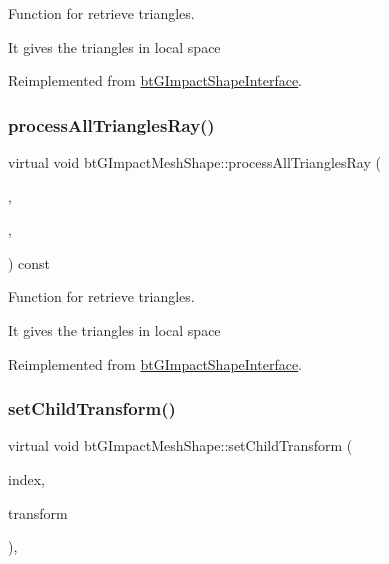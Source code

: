 Function for retrieve triangles. 

It gives the triangles in local space 

Reimplemented from \hyperlink{classbtGImpactShapeInterface_af67273183582c6696169ee4ae5d6cf37}{bt\+G\+Impact\+Shape\+Interface}.

\mbox{\label{classbtGImpactMeshShape_a0c02d97f918e04fdb0e59d310861f119}} 
\subsubsection{\texorpdfstring{process\+All\+Triangles\+Ray()}{processAllTrianglesRay()}\hspace{0.1cm}{\footnotesize\ttfamily [2/2]}}
{\footnotesize\ttfamily virtual void bt\+G\+Impact\+Mesh\+Shape\+::process\+All\+Triangles\+Ray (\begin{DoxyParamCaption}\item[{\hyperlink{classbtTriangleCallback}{bt\+Triangle\+Callback} $\ast$}]{,  }\item[{const bt\+Vector3 \&}]{,  }\item[{const bt\+Vector3 \&}]{ }\end{DoxyParamCaption}) const\hspace{0.3cm}{\ttfamily [virtual]}}



Function for retrieve triangles. 

It gives the triangles in local space 

Reimplemented from \hyperlink{classbtGImpactShapeInterface_af67273183582c6696169ee4ae5d6cf37}{bt\+G\+Impact\+Shape\+Interface}.

\mbox{\label{classbtGImpactMeshShape_a274feed3c9a38a6af5c9f1141ae9ac1a}} 
\subsubsection{\texorpdfstring{set\+Child\+Transform()}{setChildTransform()}\hspace{0.1cm}{\footnotesize\ttfamily [1/2]}}
{\footnotesize\ttfamily virtual void bt\+G\+Impact\+Mesh\+Shape\+::set\+Child\+Transform (\begin{DoxyParamCaption}\item[{int}]{index,  }\item[{const bt\+Transform \&}]{transform }\end{DoxyParamCaption})\hspace{0.3cm}{\ttfamily [inline]}, {\ttfamily [virtual]}}



